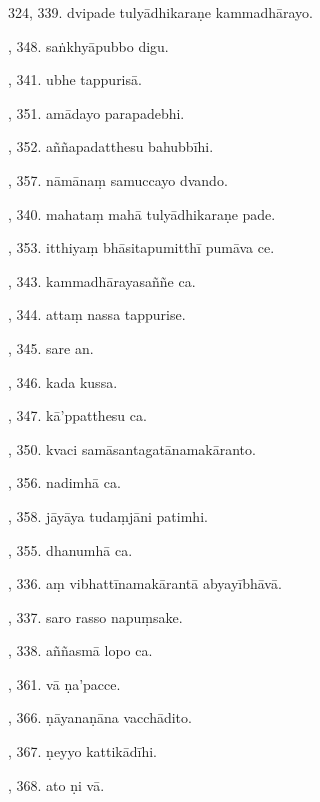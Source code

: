 324, 339. dvipade tulyādhikaraṇe kammadhārayo.\hfill \pageref{sut:324}\par {}, 348. saṅkhyāpubbo digu.\hfill \pageref{sut:325}\par {}, 341. ubhe tappurisā.\hfill \pageref{sut:326}\par {}, 351. amādayo parapadebhi.\hfill \pageref{sut:327}\par {}, 352. aññapadatthesu bahubbīhi.\hfill \pageref{sut:328}\par {}, 357. nāmānaṃ samuccayo dvando.\hfill \pageref{sut:329}\par {}, 340. mahataṃ mahā tulyādhikaraṇe pade.\hfill \pageref{sut:330}\par {}, 353. itthiyaṃ bhāsitapumitthī pumāva ce.\hfill \pageref{sut:331}\par {}, 343. kammadhārayasaññe ca.\hfill \pageref{sut:332}\par {}, 344. attaṃ nassa tappurise.\hfill \pageref{sut:333}\par {}, 345. sare an.\hfill \pageref{sut:334}\par {}, 346. kada kussa.\hfill \pageref{sut:335}\par {}, 347. kā’ppatthesu ca.\hfill \pageref{sut:336}\par {}, 350. kvaci samāsantagatānamakāranto.\hfill \pageref{sut:337}\par {}, 356. nadimhā ca.\hfill \pageref{sut:338}\par {}, 358. jāyāya tudaṃjāni patimhi.\hfill \pageref{sut:339}\par {}, 355. dhanumhā ca.\hfill \pageref{sut:340}\par {}, 336. aṃ vibhattīnamakārantā abyayībhāvā.\hfill \pageref{sut:341}\par {}, 337. saro rasso napuṃsake.\hfill \pageref{sut:342}\par {}, 338. aññasmā lopo ca.\hfill \pageref{sut:343}\par {}, 361. vā ṇa’pacce.\hfill \pageref{sut:344}\par {}, 366. ṇāyanaṇāna vacchādito.\hfill \pageref{sut:345}\par {}, 367. ṇeyyo kattikādīhi.\hfill \pageref{sut:346}\par {}, 368. ato ṇi vā.\hfill \pageref{sut:347}\par \noindent
